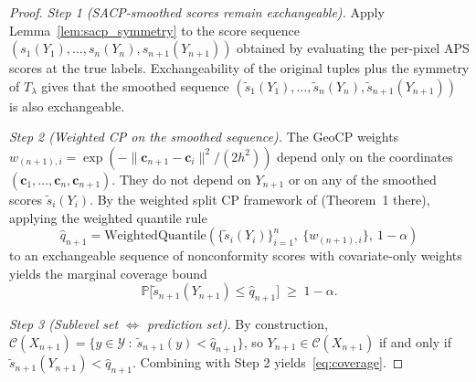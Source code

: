 \documentclass[11pt]{article}
\newcommand{\1}{\mathbf{1}}
\newcommand{\Prob}{\mathbb{P}}
\begin{document}
\begin{proof}
\emph{Step 1 (SACP-smoothed scores remain exchangeable).} Apply Lemma~\ref{lem:sacp_symmetry} to the score sequence $(s_1(Y_1), \ldots, s_n(Y_n), s_{n+1}(Y_{n+1}))$ obtained by evaluating the per-pixel APS scores at the true labels. Exchangeability of the original tuples plus the symmetry of $T_\lambda$ gives that the smoothed sequence $(\tilde s_1(Y_1), \ldots, \tilde s_n(Y_n), \tilde s_{n+1}(Y_{n+1}))$ is also exchangeable.

\emph{Step 2 (Weighted CP on the smoothed sequence).} The GeoCP weights $w_{(n+1),i} = \exp(-\|\mathbf{c}_{n+1} - \mathbf{c}_i\|^2/(2h^2))$ depend only on the coordinates $(\mathbf{c}_1, \ldots, \mathbf{c}_n, \mathbf{c}_{n+1})$. They do not depend on $Y_{n+1}$ or on any of the smoothed scores $\tilde s_i(Y_i)$. By the weighted split CP framework of \citet{tibshirani2019conformal} (Theorem~1 there), applying the weighted quantile rule
\[
    \hat q_{n+1} = \text{WeightedQuantile}\!\left(\{\tilde s_i(Y_i)\}_{i=1}^n,\ \{w_{(n+1),i}\},\ 1 - \alpha\right)
\]
to an exchangeable sequence of nonconformity scores with covariate-only weights yields the marginal coverage bound
\[
    \Prob\bigl[\tilde s_{n+1}(Y_{n+1}) \le \hat q_{n+1}\bigr] \;\ge\; 1 - \alpha.
\]

\emph{Step 3 (Sublevel set $\Leftrightarrow$ prediction set).} By construction, $\mathcal{C}(X_{n+1}) = \{y \in \mathcal{Y}\ :\ \tilde s_{n+1}(y) < \hat q_{n+1}\}$, so $Y_{n+1} \in \mathcal{C}(X_{n+1})$ if and only if $\tilde s_{n+1}(Y_{n+1}) < \hat q_{n+1}$. Combining with Step 2 yields~\eqref{eq:coverage}.
\end{proof}
\end{document}
